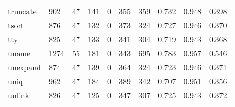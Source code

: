 \begin{longtable}{lp{1.3cm}p{1.3cm}p{1.3cm}p{1.3cm}p{1.3cm}p{1.3cm}p{1.3cm}p{1.3cm}p{1.3cm}}
truncate  &                    902 &                                 47 &                               141 &                                0 &                               355 &                             359 &                                   0.732 &                                  0.948 &                                0.398 \\
tsort     &                    876 &                                 47 &                               132 &                                0 &                               373 &                             324 &                                   0.727 &                                  0.946 &                                0.370 \\
tty       &                    825 &                                 47 &                               133 &                                0 &                               341 &                             304 &                                   0.719 &                                  0.943 &                                0.368 \\
uname     &                   1274 &                                 55 &                               181 &                                0 &                               343 &                             695 &                                   0.783 &                                  0.957 &                                0.546 \\
unexpand  &                    874 &                                 47 &                               139 &                                0 &                               364 &                             324 &                                   0.723 &                                  0.946 &                                0.371 \\
uniq      &                    962 &                                 47 &                               184 &                                0 &                               389 &                             342 &                                   0.707 &                                  0.951 &                                0.356 \\
unlink    &                    826 &                                 47 &                               125 &                                0 &                               347 &                             307 &                                   0.725 &                                  0.943 &                                0.372 \\

\end{longtable}
